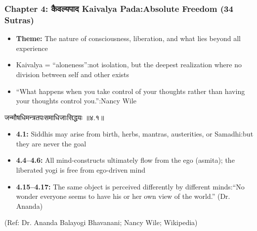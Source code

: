 \begin{frame}[fragile]\frametitle{Chapter 4: कैवल्यपाद Kaivalya Pada:Absolute Freedom (34 Sutras)}

\begin{itemize}
\item \textbf{Theme:} The nature of consciousness, liberation, and what lies beyond all experience
\item Kaivalya = ``aloneness'':not isolation, but the deepest realization where no division between self and other exists
\item ``What happens when you take control of your thoughts rather than having your thoughts control you.'':Nancy Wile
\end{itemize}

\begin{sanskrit}
जन्मौषधिमन्त्रतपःसमाधिजाःसिद्धयः ॥४.१॥
\end{sanskrit}

\begin{itemize}
\item \textbf{4.1:} Siddhis may arise from birth, herbs, mantras, austerities, or Samadhi:but they are never the goal
\item \textbf{4.4–4.6:} All mind-constructs ultimately flow from the ego (asmita); the liberated yogi is free from ego-driven mind
\item \textbf{4.15–4.17:} The same object is perceived differently by different minds:``No wonder everyone seems to have his or her own view of the world.'' (Dr. Ananda)
\end{itemize}

\tiny{(Ref: Dr. Ananda Balayogi Bhavanani; Nancy Wile; Wikipedia)}

\end{frame}

